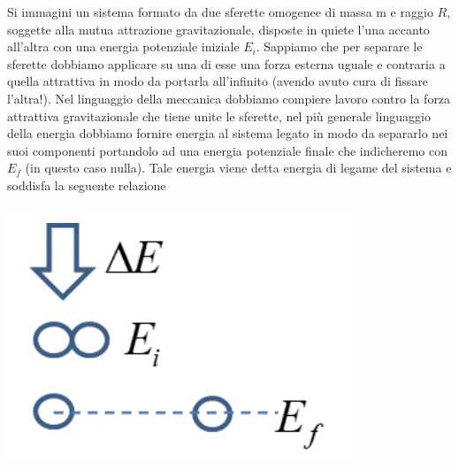 Si immagini un sistema formato da due sferette omogenee di massa m e raggio $R$, soggette alla mutua attrazione gravitazionale, disposte in quiete l'una accanto all'altra con una energia potenziale iniziale $E_{i}$.
Sappiamo che per separare le sferette dobbiamo applicare su una di esse una forza esterna uguale e contraria a quella attrattiva in modo da portarla all'infinito (avendo avuto cura di fissare l'altra!).
Nel linguaggio della meccanica dobbiamo compiere lavoro contro la forza attrattiva gravitazionale che tiene unite le sferette, nel più generale linguaggio della energia dobbiamo fornire energia al sistema legato in modo da separarlo nei suoi componenti portandolo ad una energia potenziale finale che indicheremo con $E_{f}$ (in questo caso nulla).
Tale energia viene detta energia di legame del sistema e soddisfa la seguente relazione

\begin{marginfigure}
	\includegraphics{figs/en-legame}
	\label{fig:en-legame}
\end{marginfigure}

